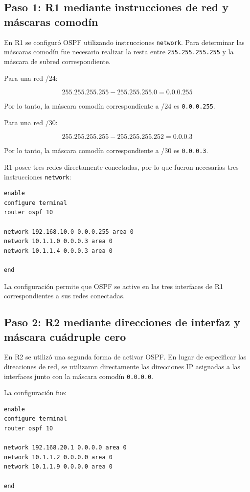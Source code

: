 \documentclass[12pt,a4paper]{article}
\begin{document}
\subsection{Paso 1: R1 mediante instrucciones de red y máscaras comodín}

En R1 se configuró OSPF utilizando instrucciones \texttt{network}.
Para determinar las máscaras comodín fue necesario realizar la
resta entre \texttt{255.255.255.255} y la máscara de subred
correspondiente.

Para una red /24:

\[
255.255.255.255 - 255.255.255.0
= 0.0.0.255
\]

Por lo tanto, la máscara comodín correspondiente a /24 es
\texttt{0.0.0.255}.

Para una red /30:

\[
255.255.255.255 - 255.255.255.252
= 0.0.0.3
\]

Por lo tanto, la máscara comodín correspondiente a /30 es
\texttt{0.0.0.3}.

R1 posee tres redes directamente conectadas, por lo que fueron
necesarias tres instrucciones \texttt{network}:

\begin{lstlisting}[style=cisco]
enable
configure terminal
router ospf 10

network 192.168.10.0 0.0.0.255 area 0
network 10.1.1.0 0.0.0.3 area 0
network 10.1.1.4 0.0.0.3 area 0

end
\end{lstlisting}

La configuración permite que OSPF se active en las tres interfaces de
R1 correspondientes a sus redes conectadas.

\subsection{Paso 2: R2 mediante direcciones de interfaz y máscara
cuádruple cero}

En R2 se utilizó una segunda forma de activar OSPF. En lugar de
especificar las direcciones de red, se utilizaron directamente las
direcciones IP asignadas a las interfaces junto con la máscara
comodín \texttt{0.0.0.0}.

La configuración fue:

\begin{lstlisting}[style=cisco]
enable
configure terminal
router ospf 10

network 192.168.20.1 0.0.0.0 area 0
network 10.1.1.2 0.0.0.0 area 0
network 10.1.1.9 0.0.0.0 area 0

end
\end{lstlisting}
\end{document}
